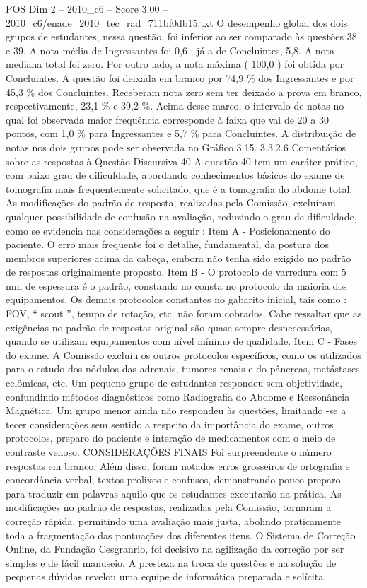 \begin{textsample}{POS Dim 2 – 2010\_c6 – Score 3.00 – 2010\_c6/enade\_2010\_tec\_rad\_711bf0db15.txt}
O desempenho global dos dois grupos de estudantes, nessa questão, foi inferior ao ser comparado às questões 38 e 39.
A nota média de Ingressantes foi 0,6 ; já a de Concluintes, 5,8.
A nota mediana total foi zero.
Por outro lado, a nota máxima ( 100,0 ) foi obtida por Concluintes.
A questão foi deixada em branco por 74,9 \% dos Ingressantes e por 45,3 \% dos Concluintes.
Receberam nota zero sem ter deixado a prova em branco, respectivamente, 23,1 \% e 39,2 \%.
Acima desse marco, o intervalo de notas no qual foi observada maior frequência corresponde à faixa que vai de 20 a 30 pontos, com 1,0 \% para Ingressantes e 5,7 \% para Concluintes.
A distribuição de notas nos dois grupos pode ser observada no Gráfico 3.15. 3.3.2.6 Comentários sobre as respostas à Questão Discursiva 40 A questão 40 tem um caráter prático, com baixo grau de dificuldade, abordando conhecimentos básicos do exame de tomografia mais frequentemente solicitado, que é a tomografia do abdome total.
As modificações do padrão de resposta, realizadas pela Comissão, excluíram qualquer possibilidade de confusão na avaliação, reduzindo o grau de dificuldade, como se evidencia nas considerações a seguir : Item A - Posicionamento do paciente.
O erro mais frequente foi o detalhe, fundamental, da postura dos membros superiores acima da cabeça, embora não tenha sido exigido no padrão de respostas originalmente proposto.
Item B - O protocolo de varredura com 5 mm de espessura é o padrão, constando no consta no protocolo da maioria dos equipamentos.
Os demais protocolos constantes no gabarito inicial, tais como : FOV, “ scout ”, tempo de rotação, etc. não foram cobrados.
Cabe ressaltar que as exigências no padrão de respostas original são quase sempre desnecessárias, quando se utilizam equipamentos com nível mínimo de qualidade.
Item C - Fases do exame.
A Comissão excluiu os outros protocolos específicos, como os utilizados para o estudo dos nódulos das adrenais, tumores renais e do pâncreas, metástases celômicas, etc.
Um pequeno grupo de estudantes respondeu sem objetividade, confundindo métodos diagnósticos como Radiografia do Abdome e Ressonância Magnética.
Um grupo menor ainda não respondeu às questões, limitando -se a tecer considerações sem sentido a respeito da importância do exame, outros protocolos, preparo do paciente e interação de medicamentos com o meio de contraste venoso.
CONSIDERAÇÕES FINAIS Foi surpreendente o número respostas em branco.
Além disso, foram notados erros grosseiros de ortografia e concordância verbal, textos prolixos e confusos, demonstrando pouco preparo para traduzir em palavras aquilo que os estudantes executarão na prática.
As modificações no padrão de respostas, realizadas pela Comissão, tornaram a correção rápida, permitindo uma avaliação mais justa, abolindo praticamente toda a fragmentação das pontuações dos diferentes itens.
O Sistema de Correção Online, da Fundação Cesgranrio, foi decisivo na agilização da correção por ser simples e de fácil manuseio.
A presteza na troca de questões e na solução de pequenas dúvidas revelou uma equipe de informática preparada e solícita.

\end{textsample}
